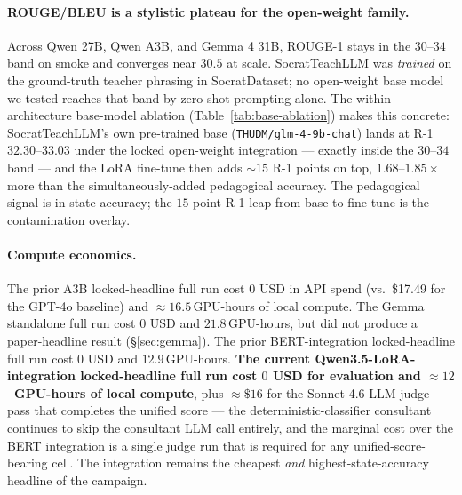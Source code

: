 \documentclass[11pt]{article}
\begin{document}
\paragraph{ROUGE/BLEU is a stylistic plateau for the open-weight family.} Across Qwen 27B, Qwen A3B, and Gemma 4 31B, ROUGE-1 stays in the $30$--$34$ band on smoke and converges near $30.5$ at scale. SocratTeachLLM was \emph{trained} on the ground-truth teacher phrasing in SocratDataset; no open-weight base model we tested reaches that band by zero-shot prompting alone. The within-architecture base-model ablation (Table~\ref{tab:base-ablation}) makes this concrete: SocratTeachLLM's own pre-trained base (\texttt{THUDM/glm-4-9b-chat}) lands at R-1 $32.30$--$33.03$ under the locked open-weight integration --- exactly inside the $30$--$34$ band --- and the LoRA fine-tune then adds $\sim$$15$ R-1 points on top, $1.68$--$1.85\times$ more than the simultaneously-added pedagogical accuracy. The pedagogical signal is in state accuracy; the $15$-point R-1 leap from base to fine-tune is the contamination overlay.

\paragraph{Compute economics.} The prior A3B locked-headline full run cost $0$ USD in API spend (vs.\ \$17.49 for the GPT-4o baseline) and $\approx 16.5$\,GPU-hours of local compute. The Gemma standalone full run cost $0$ USD and $21.8$\,GPU-hours, but did not produce a paper-headline result (\S\ref{sec:gemma}). The prior BERT-integration locked-headline full run cost $0$ USD and $12.9$\,GPU-hours. \textbf{The current Qwen3.5-LoRA-integration locked-headline full run cost $0$ USD for evaluation and $\approx 12$~GPU-hours of local compute}, plus $\approx \$16$ for the Sonnet 4.6 LLM-judge pass that completes the unified score --- the deterministic-classifier consultant continues to skip the consultant LLM call entirely, and the marginal cost over the BERT integration is a single judge run that is required for any unified-score-bearing cell. The integration remains the cheapest \emph{and} highest-state-accuracy headline of the campaign.
\end{document}

